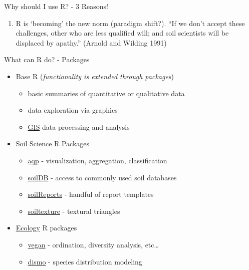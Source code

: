\documentclass[
  ignorenonframetext,
]{beamer}
\providecommand{\tightlist}{%
  \setlength{\itemsep}{0pt}\setlength{\parskip}{0pt}}
\begin{document}
\begin{frame}{Why should I use R? - 3 Reasons!}
\begin{enumerate}
  \begin{itemize}
  \tightlist
  \item
    \href{https://www.r-project.org/doc/bib/R-books.html}{R books}
  \item
    \href{https://bookdown.org/}{(Free Online) R Books}
  \end{itemize}
\item
  R is `becoming' the new norm (paradigm shift?). ``If we don't accept
  these challenges, other who are less qualified will; and soil
  scientists will be displaced by apathy.'' (Arnold and Wilding 1991)
\end{enumerate}
\end{frame}

\begin{frame}{What can R do? - Packages}
\protect\hypertarget{what-can-r-do---packages}{}
\begin{itemize}
\tightlist
\item
  Base R (\emph{functionality is extended through packages})

  \begin{itemize}
  \tightlist
  \item
    basic summaries of quantitative or qualitative data
  \item
    data exploration via graphics
  \item
    \href{https://cran.r-project.org/web/views/Spatial.html}{GIS} data
    processing and analysis
  \end{itemize}
\item
  Soil Science R Packages

  \begin{itemize}
  \tightlist
  \item
    \href{https://github.com/ncss-tech/aqp}{aqp} - visualization,
    aggregation, classification
  \item
    \href{https://github.com/ncss-tech/soilDB}{soilDB} - access to
    commonly used soil databases
  \item
    \href{https://github.com/ncss-tech/soilReports}{soilReports} -
    handful of report templates
  \item
    \href{http://soiltexture.r-forge.r-project.org/}{soiltexture} -
    textural triangles
  \end{itemize}
\item
  \href{https://cran.r-project.org/web/views/Environmetrics.html}{Ecology}
  R packages

  \begin{itemize}
  \tightlist
  \item
    \href{http://vegan.r-forge.r-project.org/}{vegan} - ordination,
    diversity analysis, etc\ldots{}
  \item
    \href{http://rspatial.org/sdm/}{dismo} - species distribution
    modeling
  \end{itemize}
\end{itemize}
\end{frame}
\end{document}
